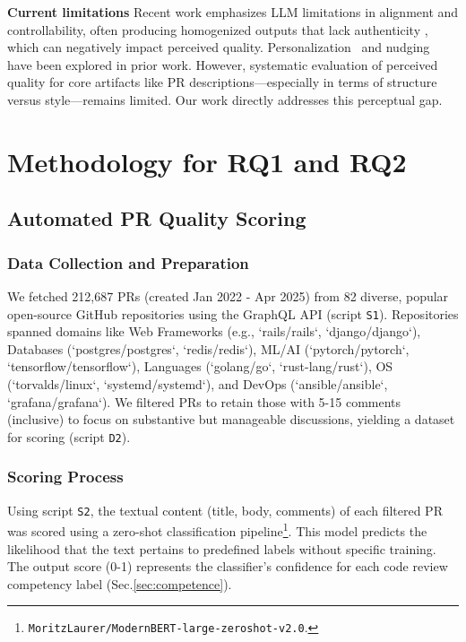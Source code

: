 \documentclass[conference]{IEEEtran}
\begin{document}
\textbf{Current limitations} Recent work emphasizes LLM limitations in alignment and controllability, often producing homogenized outputs that lack authenticity \cite{lee2025poor}, which can negatively impact perceived quality. Personalization~\cite{zhang2024personalization} and nudging~\cite{maddila2023nudge,caraban2019ways} have been explored in prior work. However, systematic evaluation of perceived quality for core artifacts like PR descriptions—especially in terms of structure versus style—remains limited. Our work directly addresses this perceptual gap.

\section{Methodology for RQ1 and RQ2}
\subsection{Automated PR Quality Scoring}
\subsubsection{Data Collection and Preparation}
We fetched 212,687 PRs (created Jan 2022 - Apr 2025) from 82 diverse, popular open-source GitHub repositories using the GraphQL API (script \texttt{S1}). Repositories spanned domains like Web Frameworks (e.g., `rails/rails`, `django/django`), Databases (`postgres/postgres`, `redis/redis`), ML/AI (`pytorch/pytorch`, `tensorflow/tensorflow`), Languages (`golang/go`, `rust-lang/rust`), OS (`torvalds/linux`, `systemd/systemd`), and DevOps (`ansible/ansible`, `grafana/grafana`). We filtered PRs to retain those with 5-15 comments (inclusive) to focus on substantive but manageable discussions, yielding a dataset for scoring (script \texttt{D2}).

\subsubsection{Scoring Process}
Using script \texttt{S2}, the textual content (title, body, comments) of each filtered PR was scored using a zero-shot classification pipeline\footnote{\texttt{MoritzLaurer/ModernBERT-large-zeroshot-v2.0}\cite{warner2024smarter}.}. This model predicts the likelihood that the text pertains to predefined labels without specific training. The output score (0-1) represents the classifier's confidence for each code review competency label (Sec.\ref{sec:competence}).
\end{document}
